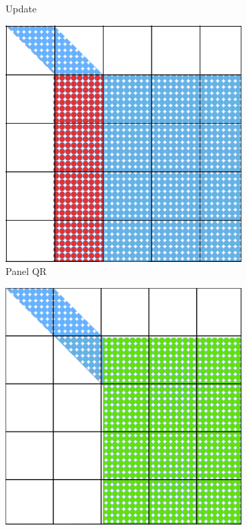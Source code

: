 \begin{figure}[h!]
\begin{subfigure}[t]{0.2 \textwidth}
      \caption{\label{fig:lq_update_1}Update}
    \end{subfigure}
    \hfill
    \begin{subfigure}[t]{0.2 \textwidth}
      \includegraphics[width=\textwidth]{fig/SVD_panel_5_grid}
      \caption{\label{fig:qr_2}Panel QR}
    \end{subfigure}
    \hfill
    \begin{subfigure}[t]{0.2 \textwidth}
      \includegraphics[width=\textwidth]{fig/SVD_panel_6_grid}

\end{subfigure}
\end{figure}
